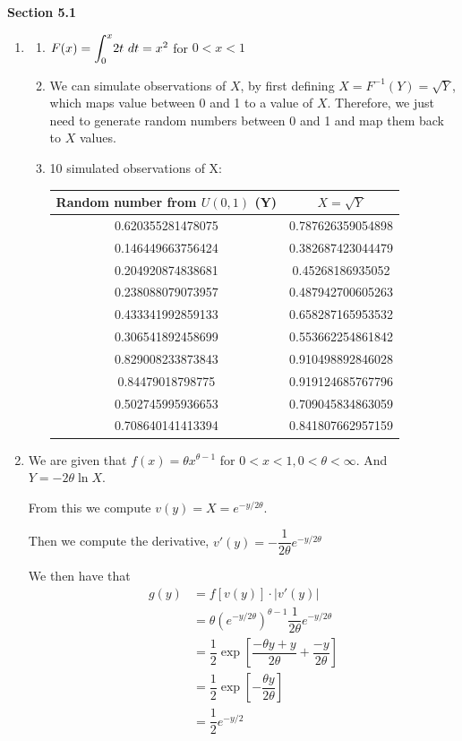 \documentclass{article}
\newcommand\lint{\mathlarger{\int}}
\begin{document}
    \newpage
    \textbf{Section 5.1}
    \begin{enumerate}
     \addtocounter{enumi}{3}
     \item 
      \begin{enumerate}
       \item
	$F(x) = \lint_0^x{2t\ dt} = x^2$ for $0 < x < 1$
       
       \item
	We can simulate observations of $X$, by first defining $X=F^{-1}(Y) = \sqrt{Y}$, which maps value between
	0 and 1 to a value of $X$. Therefore, we just need to generate random numbers between 0 and 1
	and map them back to $X$ values.
       
       \item
	10 simulated observations of X:
	\begin{center}
	  \begin{tabular}{c | c}
	    Random number from $U(0,1)$ (Y) & $X = \sqrt{Y}$ \\
	    \hline
	    0.620355281478075 & 0.787626359054898 \\
	    0.146449663756424 & 0.382687423044479 \\
	    0.204920874838681 & 0.45268186935052 \\
	    0.238088079073957 & 0.487942700605263 \\
	    0.433341992859133 & 0.658287165953532 \\
	    0.306541892458699 & 0.553662254861842 \\
	    0.829008233873843 & 0.910498892846028 \\
	    0.84479018798775 & 0.919124685767796 \\
	    0.502745995936653 & 0.709045834863059 \\
	    0.708640141413394 & 0.841807662957159 
	  \end{tabular}
	\end{center}
      \end{enumerate}
     
     \item
      We are given that $f(x) = \theta x^{\theta - 1}$ for $0 < x < 1, 0 < \theta < \infty$. And 
      $Y=-2\theta \ln{X}$. 
      
      From this we compute $v(y) = X = e^{-y/2\theta}$. 
      
      Then we compute the derivative, $v'(y) = -\dfrac{1}{2\theta}e^{-y/2\theta}$
      
      We then have that 
      \begin{align*}
       g(y) &= f[v(y)]\cdot |v'(y)| \\
	&= \theta (e^{-y/2\theta})^{\theta-1}\dfrac{1}{2\theta}e^{-y/2\theta} \\
	&= \dfrac{1}{2}\exp\left[\dfrac{-\theta y + y}{2\theta} + \dfrac{-y}{2\theta}\right] \\
	&= \dfrac{1}{2}\exp\left[-\dfrac{\theta y}{2\theta}\right] \\
	&= \dfrac{1}{2}e^{-y/2}
      \end{align*}
      

\end{enumerate}
\end{document}

